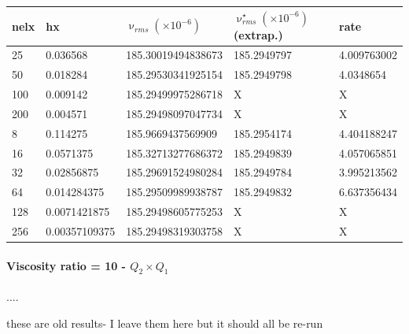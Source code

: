 \begin{tabular}{lllll}
\hline
nelx & hx & $\upnu_{rms}(\times 10^{-6})$ & $\upnu^\star_{rms}(\times 10^{-6})$ (extrap.)  & rate \\
\hline\hline
25   & 0.036568 & 185.30019494838673 & 185.2949797 & 4.009763002 \\
50   & 0.018284 & 185.29530341925154 & 185.2949798 & 4.0348654   \\
100  & 0.009142 & 185.29499975286718 & X & X \\
200  & 0.004571 & 185.29498097047734 & X & X \\
\hline
8    & 0.114275      & 185.9669437569909  &  185.2954174 & 4.404188247 \\
16   & 0.0571375     & 185.32713277686372 &  185.2949839 & 4.057065851 \\
32   & 0.02856875    & 185.29691524980284 &  185.2949784 & 3.995213562 \\
64   & 0.014284375   & 185.29509989938787 &  185.2949832 & 6.637356434 \\
128  & 0.0071421875  & 185.29498605775253 &  X           & X           \\
256  & 0.00357109375 & 185.29498319303758 &  X           & X           \\
\hline
\end{tabular}







\newpage
\paragraph{Viscosity ratio = 10 - $Q_2\times Q_1$}....

{\color{red} these are old results- I leave them here but it should all be re-run}

